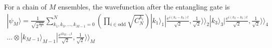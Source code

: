 \documentclass{WileyMSP-template}
\begin{document}




For a chain of $ M $ ensembles, the wavefunction after the entangling gate is
%
\begin{multline}
|\psi_M \rangle=\frac{1}{\sqrt{2^{\frac{MN}{2}}}}\sum_{k_1,k_3,\ldots,k_{M-1}=0}^{N} \left( \prod_{i \in \text{odd}} \sqrt{ C^{k_i}_{N}}  \right) %
| k_1 \rangle_1  |\frac{e^{i(k_{1}-k_{3})t}}{\sqrt{2}},\frac{1}{\sqrt{2}}\rangle\rangle_2 | k_3 \rangle_3
|\frac{e^{i(k_{3}-k_{5})t}}{\sqrt{2}},\frac{1}{\sqrt{2}}\rangle\rangle_4  \\
\dots \otimes  | k_{M-1} \rangle_{M-1} |\frac{e^{ik_{M-1}t}}{\sqrt{2}},\frac{1}{\sqrt{2}}\rangle\rangle_{M}
\label{evenpsiM}
\end{multline}
\end{document}
